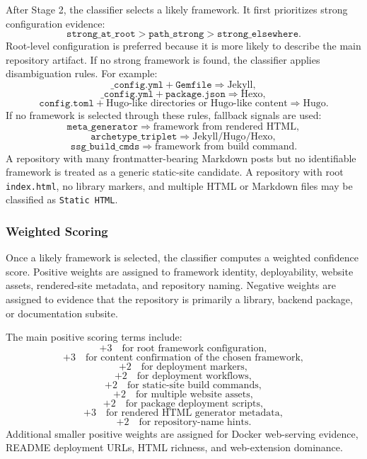 After Stage 2, the classifier selects a likely framework. It first prioritizes strong configuration evidence:
\[
\texttt{strong\_at\_root}
>
\texttt{path\_strong}
>
\texttt{strong\_elsewhere}.
\]
Root-level configuration is preferred because it is more likely to describe the main repository artifact. If no strong framework is found, the classifier applies disambiguation rules. For example:
\[
\texttt{\_config.yml} + \texttt{Gemfile} \Rightarrow \text{Jekyll},
\]
\[
\texttt{\_config.yml} + \texttt{package.json} \Rightarrow \text{Hexo},
\]
\[
\texttt{config.toml} + \text{Hugo-like directories or Hugo-like content} \Rightarrow \text{Hugo}.
\]
If no framework is selected through these rules, fallback signals are used:
\[
\texttt{meta\_generator} \Rightarrow \text{framework from rendered HTML},
\]
\[
\texttt{archetype\_triplet} \Rightarrow \text{Jekyll/Hugo/Hexo},
\]
\[
\texttt{ssg\_build\_cmds} \Rightarrow \text{framework from build command}.
\]
A repository with many frontmatter-bearing Markdown posts but no identifiable framework is treated as a generic static-site candidate. A repository with root \texttt{index.html}, no library markers, and multiple HTML or Markdown files may be classified as \texttt{Static HTML}.

\subsubsection{Weighted Scoring}

Once a likely framework is selected, the classifier computes a weighted confidence score. Positive weights are assigned to framework identity, deployability, website assets, rendered-site metadata, and repository naming. Negative weights are assigned to evidence that the repository is primarily a library, backend package, or documentation subsite.

The main positive scoring terms include:
\[
+3 \quad \text{for root framework configuration},
\]
\[
+3 \quad \text{for content confirmation of the chosen framework},
\]
\[
+2 \quad \text{for deployment markers},
\]
\[
+2 \quad \text{for deployment workflows},
\]
\[
+2 \quad \text{for static-site build commands},
\]
\[
+2 \quad \text{for multiple website assets},
\]
\[
+2 \quad \text{for package deployment scripts},
\]
\[
+3 \quad \text{for rendered HTML generator metadata},
\]
\[
+2 \quad \text{for repository-name hints}.
\]
Additional smaller positive weights are assigned for Docker web-serving evidence, README deployment URLs, HTML richness, and web-extension dominance.

